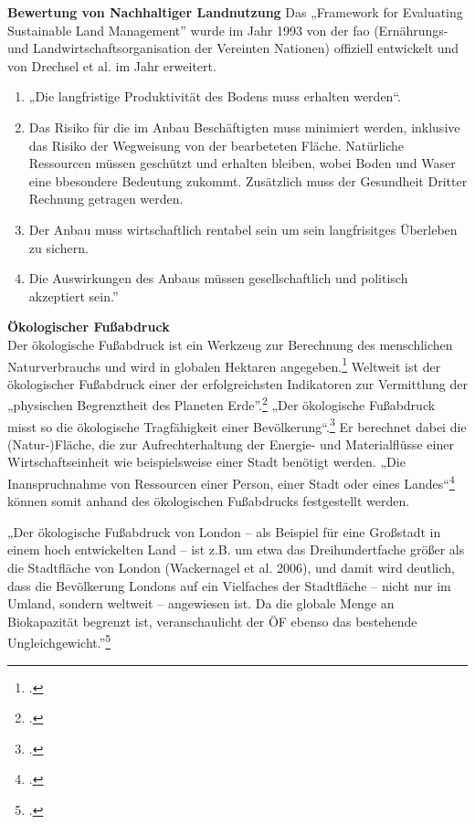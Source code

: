 \documentclass{scrartcl}
\begin{document}
\textbf{Bewertung von Nachhaltiger Landnutzung}
Das „Framework for Evaluating Sustainable Land Management” wurde im Jahr 1993 von der \acs{fao} (Ernährungs- und Landwirtschaftsorganisation der Vereinten Nationen) offiziell entwickelt und von Drechsel et al. im Jahr erweitert.

\begin{enumerate}
    \item „Die langfristige Produktivität des Bodens muss erhalten werden“.
    \item Das Risiko für die im Anbau Beschäftigten muss minimiert werden, inklusive das Risiko der Wegweisung von der bearbeteten Fläche.
    Natürliche Ressourcen müssen geschützt und erhalten bleiben, wobei Boden und Waser eine bbesondere Bedeutung zukommt. Zusätzlich muss der Gesundheit Dritter Rechnung getragen werden.
    \item Der Anbau muss wirtschaftlich rentabel sein um sein langfrisitges Überleben zu sichern.
    \item Die Auswirkungen des Anbaus müssen gesellschaftlich und politisch akzeptiert sein.”
\end{enumerate}

\textbf{Ökologischer Fußabdruck}\\
Der ökologische Fußabdruck ist ein Werkzeug zur Berechnung des menschlichen Naturverbrauchs und wird in globalen Hektaren angegeben.\footcite[S. 25]{MathisWackernagelUnserNimmt} Weltweit ist der ökologischer Fußabdruck einer der erfolgreichsten Indikatoren zur Vermittlung der „physischen Begrenztheit des Planeten Erde”.\footcite[S.2]{StefanGiljum2007WissenschaftlicheFuabdruck}
 „Der ökologische Fußabdruck misst so die ökologische Tragfähigkeit einer Bevölkerung“.\footcites[S.5]{MichelsenGrundlagenEntwicklung}[Vgl.][S.23ff]{MathisWackernagelUnserNimmt} Er berechnet dabei die  (Natur-)Fläche, die zur Aufrechterhaltung der Energie- und Materialflüsse einer Wirtschaftseinheit wie beispielsweise einer Stadt benötigt werden. 
„Die Inanspruchnahme von Ressourcen einer Person, einer Stadt oder eines Landes“\footcite[S.192]{AntjeFlade2015StadtStadtforschung} können somit anhand des ökologischen Fußabdrucks festgestellt werden. 

\begin{displayquote}
„Der ökologische Fußabdruck von London – als Beispiel für eine Großstadt in einem hoch entwickelten Land – ist z.B. um etwa das Dreihundertfache größer als die Stadtfläche von London (Wackernagel et al. 2006), und damit wird deutlich, dass die Bevölkerung Londons auf ein Vielfaches der Stadtfläche – nicht nur im Umland, sondern weltweit – angewiesen ist. Da die globale Menge an Biokapazität begrenzt ist, veranschaulicht der ÖF ebenso das bestehende Ungleichgewicht.”\footcite{AntjeFlade2015StadtStadtforschung, S.192}
\end{displayquote} 
\end{document}
